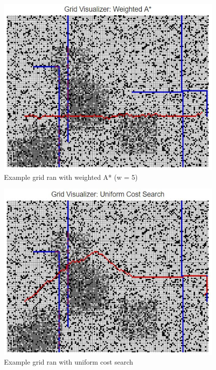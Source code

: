 \documentclass[a4paper]{article}
\begin{document}
  \begin{figure}[!ht]
  \centering
  \includegraphics[width=150mm]{weighted_a_star_w_5.JPG}
  \caption{\label{fig:Grid2}Example grid ran with weighted A* (w = 5)}
  \end{figure}
  
  \begin{figure}[!ht]
  \centering
  \includegraphics[width=150mm]{uniform_cost.JPG}
  \caption{\label{fig:Grid3}Example grid ran with uniform cost search}
  \end{figure}

\clearpage
\end{document}
